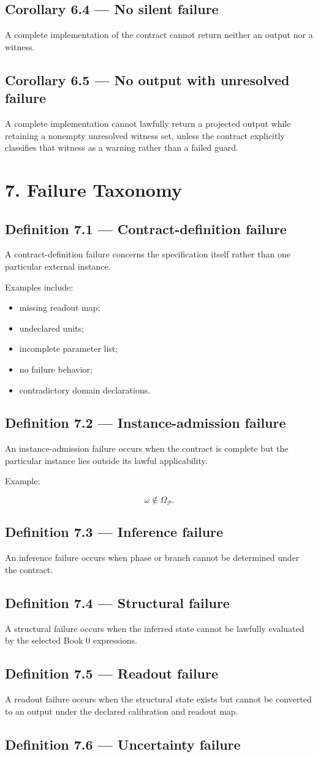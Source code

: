 \documentclass[11pt,oneside,openany]{book}
\newcommand{\PCsection}[1]{%
  \section*{#1}\addcontentsline{toc}{section}{#1}%
}
\newcommand{\PCsubsection}[1]{%
  \subsection*{#1}%
}
\begin{document}
\PCsubsection{Corollary 6.4 --- No silent failure}

A complete implementation of the contract cannot return neither an output nor a witness.

\PCsubsection{Corollary 6.5 --- No output with unresolved failure}

A complete implementation cannot lawfully return a projected output while retaining a nonempty unresolved witness set, unless the contract explicitly classifies that witness as a warning rather than a failed guard.


\PCsection{7. Failure Taxonomy}

\PCsubsection{Definition 7.1 --- Contract-definition failure}

A contract-definition failure concerns the specification itself rather than one particular external instance.

Examples include:

\begin{itemize}
\item missing readout map;
\item undeclared units;
\item incomplete parameter list;
\item no failure behavior;
\item contradictory domain declarations.
\end{itemize}
\PCsubsection{Definition 7.2 --- Instance-admission failure}

An instance-admission failure occurs when the contract is complete but the particular instance lies outside its lawful applicability.

Example:

\[
\omega\notin\Omega_{\mathcal P}.
\]

\PCsubsection{Definition 7.3 --- Inference failure}

An inference failure occurs when phase or branch cannot be determined under the contract.

\PCsubsection{Definition 7.4 --- Structural failure}

A structural failure occurs when the inferred state cannot be lawfully evaluated by the selected Book 0 expressions.

\PCsubsection{Definition 7.5 --- Readout failure}

A readout failure occurs when the structural state exists but cannot be converted to an output under the declared calibration and readout map.

\PCsubsection{Definition 7.6 --- Uncertainty failure}
\end{document}
